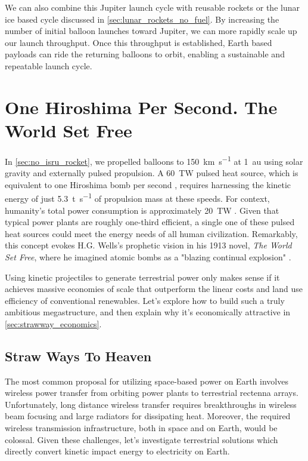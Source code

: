 \documentclass{article}
\begin{document}
{We can also combine this Jupiter launch cycle with reusable rockets or the lunar ice based cycle discussed in \autoref{sec:lunar_rockets_no_fuel}.  By increasing the number of initial balloon launches toward Jupiter, we can more rapidly scale up our launch throughput. Once this throughput is established, Earth based payloads can ride the returning balloons to orbit, enabling a sustainable and repeatable launch cycle.

\section{One Hiroshima Per Second. The World Set Free}\label{sec:world_set_free}
In \autoref{sec:no_isru_rocket}, we propelled balloons to \SI{150}{\kilo\meter\per\second} at \SI{1}{\astronomicalunit} using solar gravity and externally pulsed propulsion. A \SI{60}{\tera\watt} pulsed heat source, which is equivalent to one Hiroshima bomb per second \cite{hiroshima}, requires harnessing the kinetic energy of just \SI{5.3}{\tonne\per\second} of propulsion mass at these speeds. For context, humanity's total power consumption is approximately \SI{20}{\tera\watt} \cite{owid-energy-production-consumption}. Given that typical power plants are roughly one-third efficient, a single one of these pulsed heat sources could meet the energy needs of all human civilization.  Remarkably, this concept evokes H.G. Wells's prophetic vision in his 1913 novel, \textit{The World Set Free}, where he imagined atomic bombs as a "blazing continual explosion" \cite{wells1914world}.  

Using kinetic projectiles to generate terrestrial power only makes sense if it achieves massive economies of scale that outperform the linear costs and land use efficiency of conventional renewables.  Let's explore how to build such a truly ambitious megastructure, and then explain why it's economically attractive in \autoref{sec:strawway_economics}.     

\subsection{Straw Ways To Heaven}\label{sec:straw_way_to_heaven}
The most common proposal for utilizing space-based power on Earth involves wireless power transfer from orbiting power plants to terrestrial rectenna arrays.  Unfortunately, long distance wireless transfer requires breakthroughs in wireless beam focusing \cite{space_beaming_power} and large radiators for dissipating heat. Moreover, the required wireless transmission infrastructure, both in space and on Earth, would be colossal.  Given these challenges, let's investigate terrestrial solutions which directly convert kinetic impact energy to electricity on Earth.

}
\end{document}
